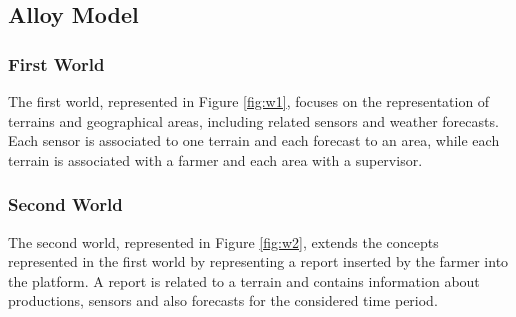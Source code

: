 \documentclass[10pt]{article}
\begin{document}
\subsection{Alloy Model}

\subsubsection{First World}

The first world, represented in Figure \ref{fig:w1}, focuses on the representation of terrains and geographical areas, including related sensors and weather forecasts.
Each sensor is associated to one terrain and each forecast to an area, while each terrain is associated with a farmer and each area with a supervisor.
\subsubsection{Second World}
The second world, represented in Figure \ref{fig:w2}, extends the concepts represented in the first world by representing a report inserted by the farmer into the platform.
A report is related to a terrain and contains information about productions, sensors and also forecasts for the considered time period.
\end{document}
